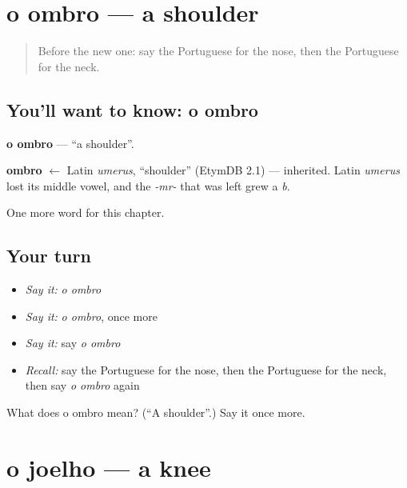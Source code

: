 \section[o ombro]{o ombro — a shoulder}

\label{lesson:PT-C31-ombro}



\begin{quote}
Before the new one: say the Portuguese for the nose, then the Portuguese for the neck.
\end{quote}

\subsection*{You'll want to know: o ombro}
\textbf{o ombro} — \textquotedblleft{}a shoulder\textquotedblright{}.

\begin{cousinweb}
\textbf{ombro} $\leftarrow$ Latin \emph{umerus}, \textquotedblleft{}shoulder\textquotedblright{} (EtymDB 2.1) — inherited. Latin \emph{umerus} lost its middle vowel, and the \emph{-mr-} that was left grew a \emph{b}.
\end{cousinweb}

\begin{grammarlens}[title={What you've built}]
One more word for this chapter.
\end{grammarlens}

\subsection*{Your turn}
\begin{itemize}
\raggedright
  \item \emph{Say it:} \emph{o ombro}
  \item \emph{Say it:} \emph{o ombro}, once more
  \item \emph{Say it:} say \emph{o ombro}
  \item \emph{Recall:} say the Portuguese for the nose, then the Portuguese for the neck, then say \emph{o ombro} again
\end{itemize}

\begin{tcolorbox}[breakable,colback=teal!4,colframe=teal!35!black,title={Before you move on}]
What does o ombro mean? (\textquotedblleft{}A shoulder\textquotedblright{}.) Say it once more.
\end{tcolorbox}
\section[o joelho]{o joelho — a knee}

